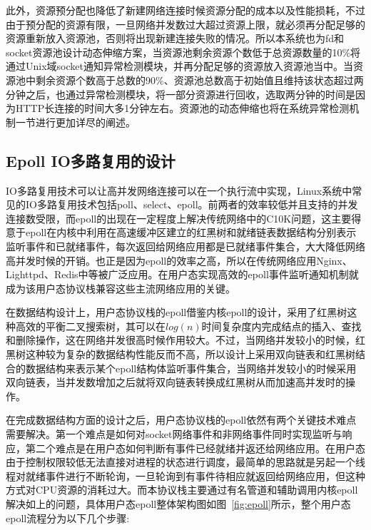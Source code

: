 此外，资源预分配也降低了新建网络连接时候资源分配的成本以及性能损耗，不过由于预分配的资源有限，一旦网络并发数过大超过资源上限，就必须再分配足够的资源重新放入资源池，否则将出现新建连接失败的情况。所以本系统也为fd和socket资源池设计动态伸缩方案，当资源池剩余资源个数低于总资源数量的10\%将通过Unix域socket通知异常检测模块，并再分配足够的资源放入资源池当中。当资源池中剩余资源个数高于总数的90\%、资源池总数高于初始值且维持该状态超过两分钟之后，也通过异常检测模块，将一部分资源进行回收，选取两分钟的时间是因为HTTP长连接的时间大多1分钟左右。资源池的动态伸缩也将在系统异常检测机制一节进行更加详尽的阐述。

\subsection{Epoll IO多路复用的设计}

IO多路复用技术可以让高并发网络连接可以在一个执行流中实现，Linux系统中常见的IO多路复用技术包括poll、select、epoll。前两者的效率较低并且支持的并发连接数受限，而epoll的出现在一定程度上解决传统网络中的C10K问题，这主要得意于epoll在内核中利用在高速缓冲区建立的红黑树和就绪链表数据结构分别表示监听事件和已就绪事件，每次返回给网络应用都是已就绪事件集合，大大降低网络高并发时候的开销。也正是因为epoll的效率之高，所以在传统网络应用Nginx、Lighttpd、Redis中等被广泛应用。在用户态实现高效的epoll事件监听通知机制就成为该用户态协议栈兼容这些主流网络应用的关键。

在数据结构设计上，用户态协议栈的epoll借鉴内核epoll的设计，采用了红黑树这种高效的平衡二叉搜索树，其可以在$log(n)$时间复杂度内完成结点的插入、查找和删除操作，这在网络并发很高时候作用较大。不过，当网络并发较小的时候，红黑树这种较为复杂的数据结构性能反而不高，所以设计上采用双向链表和红黑树结合的数据结构来表示某个epoll结构体监听事件集合，当网络并发较小的时候采用双向链表，当并发数增加之后就将双向链表转换成红黑树从而加速高并发时的操作。

在完成数据结构方面的设计之后，用户态协议栈的epoll依然有两个关键技术难点需要解决。第一个难点是如何对socket网络事件和非网络事件同时实现监听与响应，第二个难点是在用户态如何判断有事件已经就绪并返还给网络应用。在用户态由于控制权限较低无法直接对进程的状态进行调度，最简单的思路就是另起一个线程对就绪事件进行不断轮询，一旦轮询到有事件待相应就返回给网络应用，但这种方式对CPU资源的消耗过大。而本协议栈主要通过有名管道和辅助调用内核epoll解决如上的问题，具体用户态epoll整体架构图如图~\ref{fig:epoll}所示，整个用户态epoll流程分为以下几个步骤:

